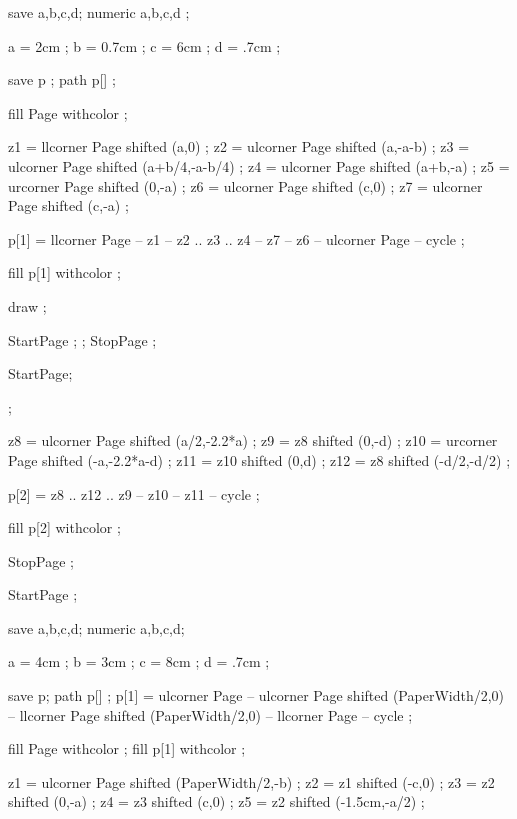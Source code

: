 save a,b,c,d;
numeric a,b,c,d ;

a = 2cm ;   b = 0.7cm ;
c = 6cm ;   d = .7cm ;

save p ; path p[] ;

fill Page withcolor  ;

z1 = llcorner Page shifted (a,0) ;
z2 = ulcorner Page shifted (a,-a-b) ;
z3 = ulcorner Page shifted (a+b/4,-a-b/4) ;
z4 = ulcorner Page shifted (a+b,-a) ;
z5 = urcorner Page shifted (0,-a) ;
z6 = ulcorner Page shifted (c,0) ;
z7 = ulcorner Page shifted (c,-a) ;


p[1] = llcorner Page -- z1 -- z2 .. z3 .. z4 -- z7 -- z6 -- 
       ulcorner Page -- cycle ;

fill p[1] withcolor  ;

draw  ;

\stopuseMPgraphic

StartPage ;
 ;
StopPage ;
\stopuniqueMPgraphic

StartPage;

 ;

z8 = ulcorner Page shifted (a/2,-2.2*a) ;
z9 = z8 shifted (0,-d) ;
z10 = urcorner Page shifted (-a,-2.2*a-d) ;
z11 = z10 shifted (0,d) ;
z12 = z8 shifted (-d/2,-d/2) ;

p[2] = z8 .. z12 .. z9 -- z10 -- z11 -- cycle ;

fill p[2] withcolor  ;

StopPage ;
\stopuniqueMPgraphic

StartPage ;

save a,b,c,d;
numeric a,b,c,d;

a = 4cm ;   b = 3cm ;
c = 8cm ;   d = .7cm ;

save p; path p[] ;
p[1] = ulcorner Page -- ulcorner Page shifted (PaperWidth/2,0) -- 
       llcorner Page shifted (PaperWidth/2,0) -- llcorner Page -- cycle ;

fill Page withcolor  ;
fill p[1] withcolor  ;

z1 = ulcorner Page shifted (PaperWidth/2,-b) ;
z2 = z1 shifted (-c,0) ;
z3 = z2 shifted (0,-a) ;
z4 = z3 shifted (c,0) ;
z5 = z2 shifted (-1.5cm,-a/2) ;

